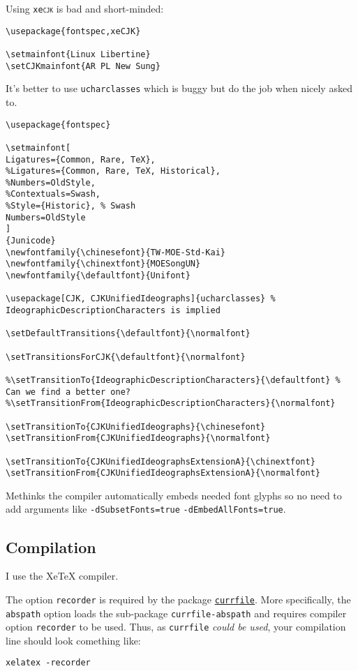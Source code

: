 Using \texttt{xe\textsc{cjk}} is bad and short-minded:
\begin{lstlisting}
\usepackage{fontspec,xeCJK}

\setmainfont{Linux Libertine}
\setCJKmainfont{AR PL New Sung}
\end{lstlisting}

It's better to use \texttt{ucharclasses} which is buggy but do the job when nicely asked to.
\begin{lstlisting}
\usepackage{fontspec}

\setmainfont[
Ligatures={Common, Rare, TeX},
%Ligatures={Common, Rare, TeX, Historical},
%Numbers=OldStyle,
%Contextuals=Swash,
%Style={Historic}, % Swash
Numbers=OldStyle
]
{Junicode}
\newfontfamily{\chinesefont}{TW-MOE-Std-Kai}
\newfontfamily{\chinextfont}{MOESongUN}
\newfontfamily{\defaultfont}{Unifont}

\usepackage[CJK, CJKUnifiedIdeographs]{ucharclasses} % IdeographicDescriptionCharacters is implied

\setDefaultTransitions{\defaultfont}{\normalfont}

\setTransitionsForCJK{\defaultfont}{\normalfont}

%\setTransitionTo{IdeographicDescriptionCharacters}{\defaultfont} % Can we find a better one?
%\setTransitionFrom{IdeographicDescriptionCharacters}{\normalfont}

\setTransitionTo{CJKUnifiedIdeographs}{\chinesefont}
\setTransitionFrom{CJKUnifiedIdeographs}{\normalfont}

\setTransitionTo{CJKUnifiedIdeographsExtensionA}{\chinextfont}
\setTransitionFrom{CJKUnifiedIdeographsExtensionA}{\normalfont}
\end{lstlisting}

Methinks the compiler automatically embeds needed font glyphs so no need to add arguments like \texttt{-dSubsetFonts=true} \texttt{-dEmbedAllFonts=true}.

\subsection{Compilation}

I use the Xe\TeX{} compiler.

The option \texttt{recorder} is required by the package \href{http://www.ctan.org/tex-archive/macros/latex/contrib/currfile}{\texttt{currfile}}. More specifically, the \texttt{abspath} option loads the sub-package \texttt{currfile-abspath} and requires compiler option \texttt{recorder} to be used. Thus, as \texttt{currfile} \textsl{could be used}, your compilation line should look comething like:

\begin{lstlisting}
xelatex -recorder
\end{lstlisting}
